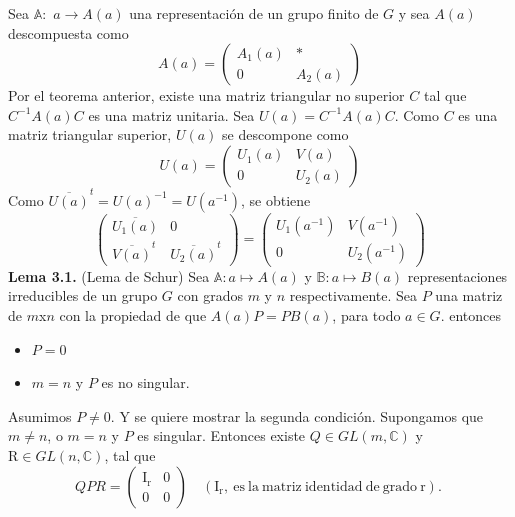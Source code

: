 \documentclass[12pt]{book}
\theoremstyle{definition}
\newcounter{in}
\newcounter{ini}
\begin{document}
Sea $\mathbb{A}:$ $a\rightarrow A\left(a\right)$ una representación de
un grupo finito de $G$ y sea $A(a)$ descompuesta como
\begin{equation*}
  A(a)=
  \begin{pmatrix}
    A_{1}(a) & * \\ 
    0 & A_{2}(a)
  \end{pmatrix}
\end{equation*}  
Por el teorema anterior, existe una matriz triangular no superior $C$
tal que $C^{-1}A(a)C$ es una matriz unitaria. Sea
$U(a)=C^{-1}A(a)C$. Como $C$ es una matriz triangular superior, $U(a)$
se descompone como
\begin{equation*}
  U(a)=
  \begin{pmatrix}
    U_{1}(a) & V(a) \\ 
    0 & U_{2}(a)
  \end{pmatrix}
\end{equation*}  
Como $\overline{U(a)}^{t}=U(a)^{-1}=U(a^{-1})$, se obtiene
\begin{equation*}
  \begin{pmatrix}
    \overline{U_{1}(a)} & 0 \\ 
    \overline{V(a)}^{t} & \overline{U_{2}(a)}^{t}
  \end{pmatrix}
  =
  \begin{pmatrix}
    U_{1}(a^{-1}) & V(a^{-1}) \\ 
    0 & U_{2}(a^{-1})
  \end{pmatrix}
\end{equation*}  
\textbf{Lema 3.1.} (Lema de Schur) Sea
$\mathbb{A} \colon a \mapsto A\left(a\right)$ y
$\mathbb{B} \colon a \mapsto B\left(a\right)$ representaciones
irreducibles de un grupo $G$ con grados $m$ y $n$ respectivamente. Sea
$P$ una matriz de $m$x$n$ con la propiedad de que $A(a)P=PB(a)$, para
todo $a \in G$.
entonces
\begin{itemize}
\item $P=0$
\item $m=n$ y $P$ es no singular.
\end{itemize}
Asumimos $P \neq 0$. Y se quiere mostrar la segunda
condición. Supongamos que $m \neq n$, o $m=n$ y $P$ es
singular. Entonces existe $Q \in GL(m,\mathbb{C})$ y
$\mathrm{R} \in GL(n,\mathbb{C})$, tal que
\begin{equation*}
  QPR=
  \begin{pmatrix}
    \mathrm{I_{r}} & 0 \\ 
    0 & 0
  \end{pmatrix} \quad \mathrm{(I_{r},\ es\ la\ matriz\ identidad\ de\ grado\ r).\ }
\end{equation*}  
\end{document}
